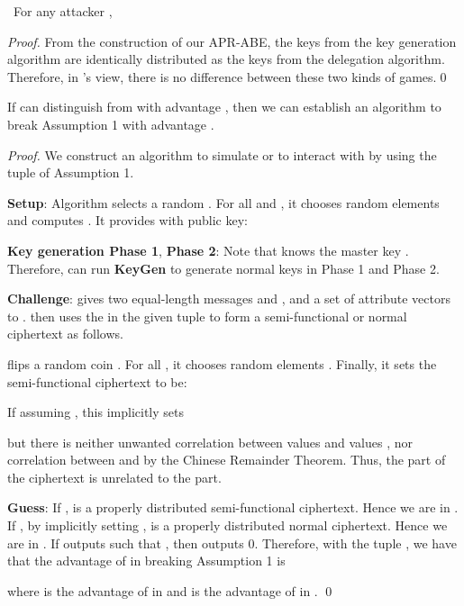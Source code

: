 \documentclass[twocolumn]{svjour3}          \smartqed  \usepackage{graphicx}
\begin{document}
\begin{lemma}\label{lem1}~For any attacker , 
\end{lemma}
\begin{proof} From the construction of our APR-ABE, the keys from the key generation algorithm are identically distributed as the keys from the delegation
algorithm. Therefore, in 's view, there is no difference between these two kinds of games.\qed
\end{proof}
\begin{lemma}\label{lem2} If   can distinguish  from  with advantage , then we can establish an algorithm
 to break Assumption 1 with advantage .
\end{lemma}
\begin{proof} We construct an algorithm  to simulate  or  to interact with  by using the tuple
 of Assumption 1.

\medskip
\noindent\textbf{Setup}: Algorithm  selects a random . For all  and , it chooses random
elements  and computes . It provides  with public
key:


\noindent\textbf{Key generation Phase 1}, \textbf{Phase 2}: Note that  knows the master key . Therefore,  can run
\textbf{KeyGen} to generate normal keys in Phase 1 and Phase 2.

\medskip
\noindent\textbf{Challenge}:  gives two equal-length messages  and , and a set  of
attribute vectors
to .  then uses the  in the given tuple to form a semi-functional or normal ciphertext as follows.

 flips a random coin . For all , it chooses random elements . Finally,
it  sets the semi-functional ciphertext  to be:


If assuming , this implicitly sets

but there is neither unwanted correlation between values  and values , nor correlation between
 and  by the Chinese Remainder Theorem. Thus, the  part of the ciphertext is unrelated to
the  part.

\medskip
\noindent\textbf{Guess}:  If ,  is a properly distributed semi-functional ciphertext. Hence we are in . If , by implicitly setting ,  is a properly distributed normal ciphertext. Hence we are in . If  outputs
 such that , then  outputs 0. Therefore, with the tuple , we have that the advantage of  in breaking
Assumption 1 is


where  is the advantage of  in  and  is the advantage of
 in .
\qed

\end{proof}
\end{document}
